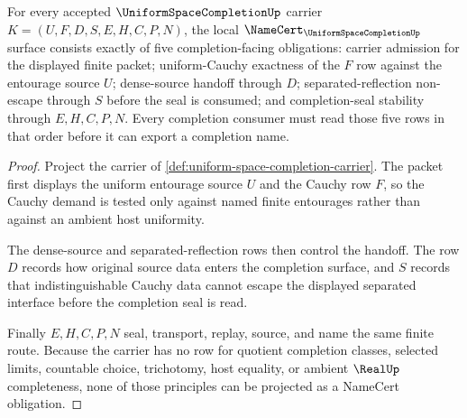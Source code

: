 \begin{theorem}
\label{thm:uniform-space-completion-namecert-obligations}
For every accepted $\UniformSpaceCompletionUp$ carrier $K=(U,F,D,S,E,H,C,P,N)$, the local $\NameCert_{\UniformSpaceCompletionUp}$ surface consists exactly of five completion-facing obligations: carrier admission for the displayed finite packet; uniform-Cauchy exactness of the $F$ row against the entourage source $U$; dense-source handoff through $D$; separated-reflection non-escape through $S$ before the seal is consumed; and completion-seal stability through $E,H,C,P,N$. Every completion consumer must read those five rows in that order before it can export a completion name.
\end{theorem}
\begin{proof}
Project the carrier of \autoref{def:uniform-space-completion-carrier}. The packet first displays the uniform entourage source $U$ and the Cauchy row $F$, so the Cauchy demand is tested only against named finite entourages rather than against an ambient host uniformity.

The dense-source and separated-reflection rows then control the handoff. The row $D$ records how original source data enters the completion surface, and $S$ records that indistinguishable Cauchy data cannot escape the displayed separated interface before the completion seal is read.

Finally $E,H,C,P,N$ seal, transport, replay, source, and name the same finite route. Because the carrier has no row for quotient completion classes, selected limits, countable choice, trichotomy, host equality, or ambient $\RealUp$ completeness, none of those principles can be projected as a NameCert obligation.
\end{proof}



